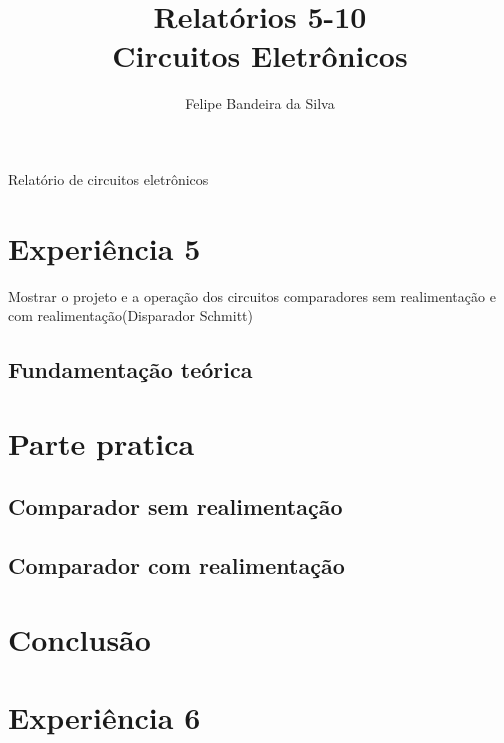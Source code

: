 \documentclass[paper=a4, fontsize=11pt]{article}
\title{Relatórios 5-10\\Circuitos Eletrônicos}
\author{Felipe Bandeira da Silva}
\date{}
\begin{document}
\maketitle

Relatório de circuitos eletrônicos

\newpage

\listoffigures


\newpage

\section{Experiência 5}

Mostrar o projeto e a operação dos circuitos comparadores sem realimentação
e com realimentação(Disparador Schmitt)

\subsection{Fundamentação teórica}

\section{Parte pratica}

\subsection{Comparador sem realimentação}

\subsection{Comparador com realimentação}

\section{Conclusão}

\newpage

\section{Experiência 6}
\end{document}
